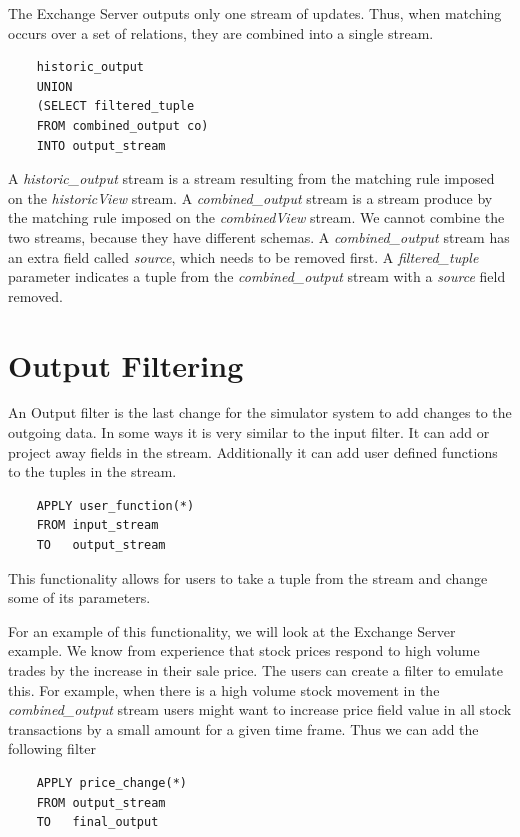 \documentclass{article}
\begin{document}
The Exchange Server outputs only one stream of updates. Thus, when matching occurs over a set of relations, they are combined into a single stream.

\begin{verbatim}
    historic_output
    UNION
    (SELECT filtered_tuple
    FROM combined_output co)
    INTO output_stream
\end{verbatim}

\noindent A \emph{historic\_output} stream is a stream resulting from the matching rule imposed on the \emph{historicView} stream. A \emph{combined\_output} stream is a stream produce by the matching rule imposed on the \emph{combinedView} stream. We cannot combine the two streams, because they have different schemas. A \emph{combined\_output} stream has an extra field called \emph{source}, which needs to be removed first. A \emph{filtered\_tuple} parameter indicates a tuple from the \emph{combined\_output} stream with a \emph{source} field removed.


\section{Output Filtering} 

An Output filter is the last change for the simulator system to add changes to the outgoing data. In some ways it is very similar to the input filter. It can add or project away fields in the stream. Additionally it can add user defined functions to the tuples in the stream.

\begin{verbatim}
    APPLY user_function(*)
    FROM input_stream
    TO   output_stream 
\end{verbatim}

This functionality allows for users to take a tuple from the stream and change some of its parameters.

For an example of this functionality, we will look at the Exchange Server example. We know from experience that stock prices respond to high volume trades by the increase in their sale price. The users can create a filter to emulate this. For example, when there is a high volume stock movement in the \emph{combined\_output} stream users might want to increase price field value in all stock transactions by a small amount for a given time frame. Thus we can add the following filter

\begin{verbatim}
    APPLY price_change(*)
    FROM output_stream
    TO   final_output 
\end{verbatim}
\end{document}
